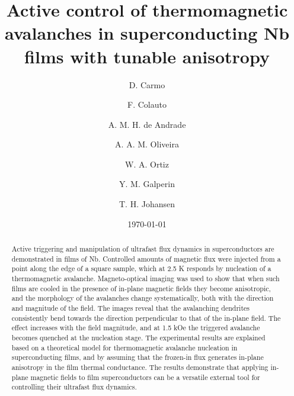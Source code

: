 \documentclass[superscriptaddress,twocolumn,aps,
showpacs]{revtex4-1}
\begin{document}

 
 \title{ %
Active control of thermomagnetic avalanches in superconducting Nb films with tunable anisotropy
} 


\author{D. Carmo}

\author{F. Colauto}

\author{A. M. H. de Andrade}

\author{A. A. M. Oliveira}

\author{W. A. Ortiz}

\author{Y. M. Galperin}

\author{T. H. Johansen}

\date{\today}

\begin{abstract}
Active triggering and manipulation of ultrafast flux dynamics in superconductors are demonstrated in films of Nb. Controlled amounts of magnetic flux were injected from a point along the edge of a square sample, which at 2.5 K responds by nucleation of a thermomagnetic avalanche.
Magneto-optical imaging was used to show that when such films are cooled in the presence of in-plane magnetic fields they become anisotropic, and the morphology of the avalanches change systematically, both with the direction and magnitude of the field.
The images reveal that the avalanching dendrites consistently bend towards the direction perpendicular to that of the in-plane field.
The effect increases with the field magnitude, and at 1.5 kOe the triggered avalanche becomes quenched at the nucleation stage.
The experimental results are explained based on a theoretical model for thermomagnetic avalanche nucleation in superconducting films, and by assuming that the frozen-in flux generates in-plane anisotropy in the film thermal conductance.
The results demonstrate that applying in-plane magnetic fields to film superconductors can be a versatile external tool for controlling their ultrafast flux dynamics.
\end{abstract}
\end{document}
